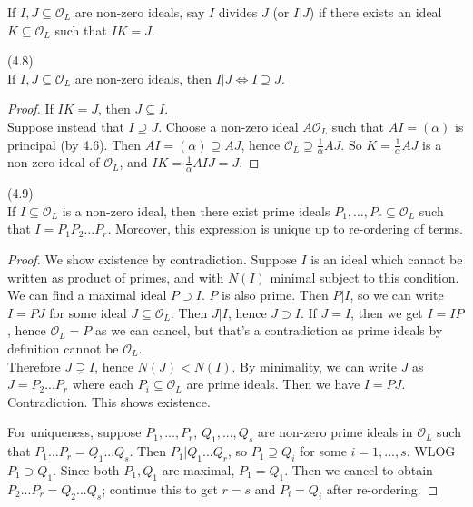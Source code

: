 \documentclass[a4paper]{article}
\begin{document}
If $I,J \subseteq \mathcal{O}_L$ are non-zero ideals, say $I$ divides $J$ (or $I | J$) if there exists an ideal $K \subseteq \mathcal{O}_L$ such that $IK = J$.

\begin{coro} (4.8)\\
If $I,J \subseteq \mathcal{O}_L$ are non-zero ideals, then $I|J \iff I \supseteq J$.
\begin{proof}
If $IK=J$, then $J \subseteq I$.\\
Suppose instead that $I \supseteq J$. Choose a non-zero ideal $A \mathcal{O}_L$ such that $AI = (\alpha)$ is principal (by 4.6). Then $AI =(\alpha) \supseteq AJ$, hence $\mathcal{O}_L \supseteq \frac{1}{\alpha} AJ$. So $K=\frac{1}{\alpha} AJ$ is a non-zero ideal of $\mathcal{O}_L$, and $IK = \frac{1}{\alpha} AIJ = J$.
\end{proof}
\end{coro}

\begin{thm} (4.9)\\
If $I \subseteq \mathcal{O}_L$ is a non-zero ideal, then there exist prime ideals $P_1,...,P_r \subseteq \mathcal{O}_L$ such that $I = P_1P_2...P_r$. Moreover, this expression is unique up to re-ordering of terms.
\begin{proof}
We show existence by contradiction. Suppose $I$ is an ideal which cannot be written as product of primes, and with $N(I)$ minimal subject to this condition. We can find a maximal ideal $P \supset I$. $P$ is also prime. Then $P|I$, so we can write $I=PJ$ for some ideal $J\subseteq \mathcal{O}_L$. Then $J|I$, hence $J \supset I$. If $J=I$, then we get $I=IP$, hence $\mathcal{O}_L = P$ as we can cancel, but that's a contradiction as prime ideals by definition cannot be $\mathcal{O}_L$.\\
Therefore $J \supsetneq I$, hence $N(J) < N(I)$. By minimality, we can write $J$ as $J=P_2...P_r$ where each $P_i\subseteq \mathcal{O}_L$ are prime ideals. Then we have $I=PJ$. Contradiction. This shows existence.

For uniqueness, suppose $P_1,...,P_r$, $Q_1,...,Q_s$ are non-zero prime ideals in $\mathcal{O}_L$ such that $P_1...P_r = Q_1...Q_s$. Then $P_1 | Q_1...Q_r$, so $P_1 \supseteq Q_i$ for some $i=1,...,s$. WLOG $P_1 \supset Q_1$. Since both $P_1,Q_1$ are maximal, $P_1 = Q_1$. Then we cancel to obtain $P_2...P_r = Q_2...Q_s$; continue this to get $r=s$ and $P_i = Q_i$ after re-ordering.
\end{proof}
\end{thm}
\end{document}

